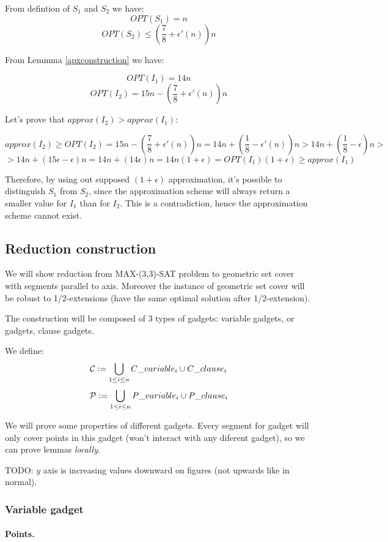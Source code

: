 From defintion of $S_1$ and $S_2$ we have:
$$OPT(S_1) = n$$
$$OPT(S_2) \le (\frac{7}{8} + \epsilon'(n))n$$

From Lemmma \ref{apxconstruction} we have:

$$OPT(I_1) = 14n$$
$$OPT(I_2) = 15n - (\frac{7}{8} + \epsilon'(n))n$$

Let's prove that $approx(I_2) > approx(I_1)$:

$$approx(I_2) \ge OPT(I_2) = 15n - (\frac{7}{8} + \epsilon'(n))n
	= 14n + (\frac{1}{8} - \epsilon'(n))n
	> 14n + (\frac{1}{8} - \epsilon)n > $$
$$	> 14n + (15\epsilon - \epsilon)n
	= 14n + (14\epsilon)n
	= 14n(1+\epsilon)
	= OPT(I_1)(1+\epsilon) \ge approx(I_1)$$ 



Therefore, by using out supposed $(1+\epsilon)$ approximation,
it’s possible to distinguish $S_1$ from $S_2$, since
the approximation scheme will always return a smaller value
for $I_1$ than for $I_2$. This is a contradiction,
hence the approximation scheme cannot exist.

\subsection{Reduction construction}
We will show reduction from MAX-(3,3)-SAT problem
to geometric set cover with segments
parallel to axis. Moreover the instance
of geometric set cover will be robust
to 1/2-extensions (have the same optimal solution
after 1/2-extension).

The construction will be composed of 3 types of gadgets:
variable gadgets, or gadgets, clause gadgets.

We define:
$$\mathcal{C} := \bigcup_{1 \le i \le n} C\_variable_i \cup C\_clause_i $$
$$\mathcal{P} := \bigcup_{1 \le i \le n} P\_variable_i \cup P\_clause_i $$

We will prove some properties of different gadgets.
Every segment for gadget will only cover points 
in this gadget (won't interact with any diferent gadget),
so we can prove lemmas \textit{locally}.


TODO: $y$ axis is increasing values downward on figures
(not upwards like in normal).

\subsubsection{Variable gadget}

\paragraph{Points.}


